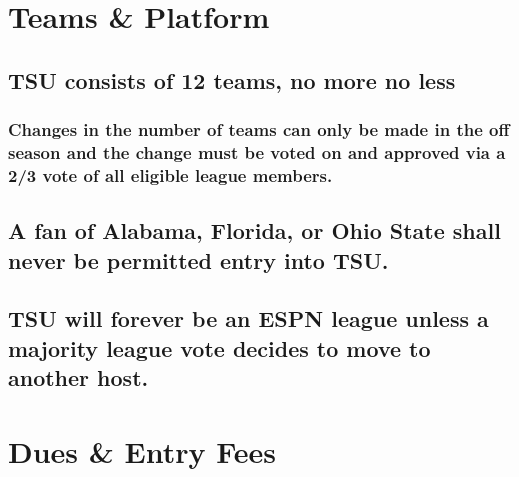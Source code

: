 \documentclass[]{book}
\begin{document}
\hypertarget{teams-platform}{%
\section{Teams \& Platform}\label{teams-platform}}

\hypertarget{tsu-consists-of-12-teams-no-more-no-less}{%
\subsection{TSU consists of 12 teams, no more no less}\label{tsu-consists-of-12-teams-no-more-no-less}}

\hypertarget{changes-in-the-number-of-teams-can-only-be-made-in-the-off-season-and-the-change-must-be-voted-on-and-approved-via-a-23-vote-of-all-eligible-league-members.}{%
\subsubsection{Changes in the number of teams can only be made in the off season and the change must be voted on and approved via a 2/3 vote of all eligible league members.}\label{changes-in-the-number-of-teams-can-only-be-made-in-the-off-season-and-the-change-must-be-voted-on-and-approved-via-a-23-vote-of-all-eligible-league-members.}}

\hypertarget{a-fan-of-alabama-florida-or-ohio-state-shall-never-be-permitted-entry-into-tsu.}{%
\subsection{A fan of Alabama, Florida, or Ohio State shall never be permitted entry into TSU.}\label{a-fan-of-alabama-florida-or-ohio-state-shall-never-be-permitted-entry-into-tsu.}}

\hypertarget{tsu-will-forever-be-an-espn-league-unless-a-majority-league-vote-decides-to-move-to-another-host.}{%
\subsection{TSU will forever be an ESPN league unless a majority league vote decides to move to another host.}\label{tsu-will-forever-be-an-espn-league-unless-a-majority-league-vote-decides-to-move-to-another-host.}}

\hypertarget{dues-entry-fees}{%
\section{Dues \& Entry Fees}\label{dues-entry-fees}}
\end{document}
